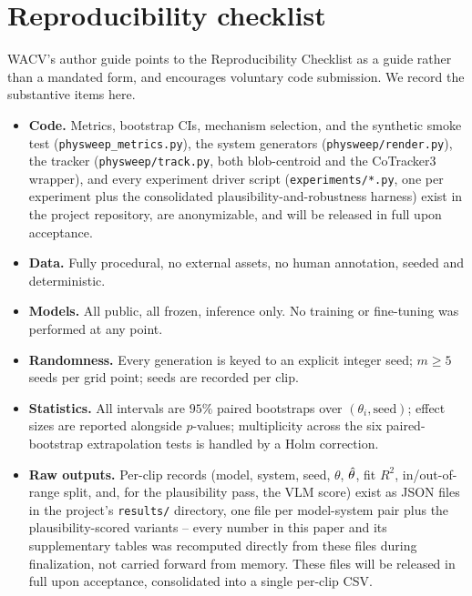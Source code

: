 \documentclass[10pt,twocolumn,letterpaper]{article}
\begin{document}
\section{Reproducibility checklist}
\label{app:checklist}
WACV's author guide points to the Reproducibility Checklist as a guide rather
than a mandated form, and encourages voluntary code submission. We record the
substantive items here.

\begin{itemize}[leftmargin=1.2em,itemsep=1pt,topsep=2pt]
\item \textbf{Code.} Metrics, bootstrap CIs, mechanism selection, and the
synthetic smoke test (\texttt{physweep\_metrics.py}), the system
generators (\texttt{physweep/render.py}), the tracker
(\texttt{physweep/track.py}, both blob-centroid and the CoTracker3
wrapper), and every experiment driver script (\texttt{experiments/*.py},
one per experiment plus the consolidated plausibility-and-robustness
harness) exist in the project repository, are anonymizable, and will be
released in full upon acceptance.
\item \textbf{Data.} Fully procedural, no external assets, no human
annotation, seeded and deterministic.
\item \textbf{Models.} All public, all frozen, inference only. No training or
fine-tuning was performed at any point.
\item \textbf{Randomness.} Every generation is keyed to an explicit integer
seed; $m\ge5$ seeds per grid point; seeds are recorded per clip.
\item \textbf{Statistics.} All intervals are $95\%$ paired bootstraps over
$(\theta_i,\text{seed})$; effect sizes are reported alongside $p$-values;
multiplicity across the six paired-bootstrap extrapolation tests is handled
by a Holm correction.
\item \textbf{Raw outputs.} Per-clip records (model, system, seed, $\theta$,
$\hat{\theta}$, fit $R^2$, in/out-of-range split, and, for the plausibility
pass, the VLM score) exist as JSON files in the project's \texttt{results/}
directory, one file per model-system pair plus the plausibility-scored
variants -- every number in this paper and its supplementary tables was
recomputed directly from these files during finalization, not carried
forward from memory. These files will be released in full upon
acceptance, consolidated into a single per-clip CSV.
\end{itemize}
\end{document}
